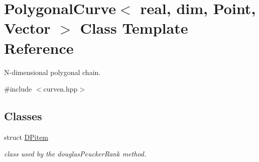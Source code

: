 \hypertarget{classPolygonalCurve}{
\section{PolygonalCurve$<$ real, dim, Point, Vector $>$ Class Template Reference}
\label{classPolygonalCurve}
}


N-\/dimensional polygonal chain.  




{\ttfamily \#include $<$curven.hpp$>$}

\subsection*{Classes}
\begin{DoxyCompactItemize}
\item 
struct \hyperlink{structPolygonalCurve_1_1DPitem}{DPitem}
\begin{DoxyCompactList}\small\item\em class used by the douglasPeuckerRank method. \end{DoxyCompactList}\end{DoxyCompactItemize}
